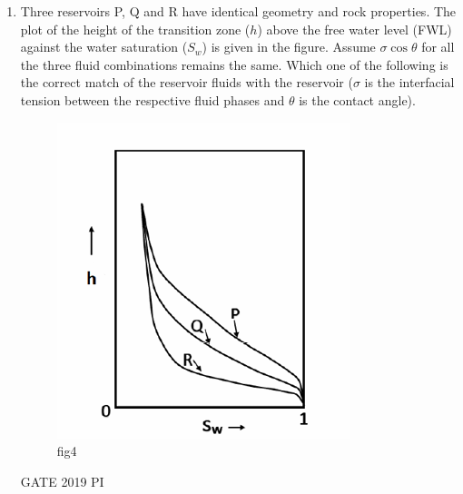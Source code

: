 \documentclass[journal,12pt,onecolumn]{IEEEtran}
\theoremstyle{remark}
\begin{document}
\begin{enumerate}
\begin{multicols}{2}
\begin{enumerate}
    \item $2p - q + 1 = 0$
    \item $2q + p + 1 = 0$
    \item $2p + q - 1 = 0$
    \item $2q + p - 1 = 0$
\end{enumerate}
\end{multicols}
\item Three reservoirs P, Q and R have identical geometry and rock properties. The plot of the height of the transition zone ($h$) above the free water level (FWL) against the water saturation ($S_w$) is given in the figure. Assume $\sigma \cos \theta$ for all the three fluid combinations remains the same. Which one of the following is the correct match of the reservoir fluids with the reservoir ($\sigma$ is the interfacial tension between the respective fluid phases and $\theta$ is the contact angle).
\begin{figure}[H]
    \centering
    \includegraphics[width=0.5\linewidth]{figs/Q.28.png}
    \caption{fig4}
    \label{fig:figs/Q.28.png}
    
\end{figure}

\hfill{GATE 2019 PI}


\end{enumerate}
\end{document}
